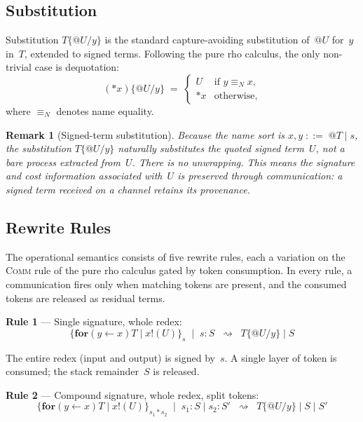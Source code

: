 \documentclass[11pt,a4paper]{article}
\makeatletter
\newtheorem{remark}[theorem]{Remark}
\newcommand{\Par}{\mathbin{|}}
\newcommand{\forc}{\mathbf{for}}
\newcommand{\send}[2]{#1 !\!\left( #2 \right)}
\newcommand{\recv}[3]{\forc\!\left( #1 \leftarrow #2 \right) #3}
\newcommand{\drop}[1]{{\ast} #1}
\newcommand{\quot}[1]{@#1}
\newcommand{\subst}[3]{#1\{#2 / #3\}}
\newcommand{\signed}[2]{\{#1\}_{#2}}
\newcommand{\comp}{\mathbin{*}}
\newcommand{\Neq}{\equiv_{\!N}}
\newcommand{\red}{\rightsquigarrow}
\makeatother
\begin{document}
\subsection{Substitution}
\label{sec:subst}

Substitution $T\{\quot{U}/y\}$ is the standard capture-avoiding
substitution of~$\quot{U}$ for~$y$ in~$T$, extended to signed
terms.  Following the pure rho calculus, the only non-trivial
case is dequotation:
\[
  (\drop{x})\{\quot{U}/y\}
  \;=\;
  \begin{cases}
    U & \text{if } y \Neq x, \\
    \drop{x} & \text{otherwise,}
  \end{cases}
\]
where $\Neq$ denotes name equality.

\begin{remark}[Signed-term substitution]
  \label{rem:signed-subst}
  Because the name sort is $x, y \;::=\; \quot{T} \mid s$,
  the substitution $T\{\quot{U}/y\}$ naturally substitutes the
  quoted \emph{signed term}~$U$, not a bare process extracted
  from~$U$.  There is no unwrapping.  This means the signature
  and cost information associated with~$U$ is \emph{preserved
  through communication}: a signed term received on a channel
  retains its provenance.
\end{remark}

\subsection{Rewrite Rules}
\label{sec:rewrites}

The operational semantics consists of five rewrite rules, each
a variation on the \textsc{Comm} rule of the pure rho calculus
gated by token consumption.  In every rule, a communication
fires only when matching tokens are present, and the
consumed tokens are released as residual terms.

\bigskip
\noindent
\textbf{Rule 1} --- Single signature, whole redex:
\begin{equation}
  \boxed{
    \signed{\recv{y}{x}{T} \Par \send{x}{U}}{s}
    \;\Par\; s : S
    \;\;\red\;\;
    \subst{T}{\quot{U}}{y} \Par S
  }
  \label{eq:rule1}
\end{equation}

\noindent
The entire redex (input and output) is signed by~$s$.  A single
layer of token is consumed; the stack remainder~$S$ is released.

\bigskip
\noindent
\textbf{Rule 2} --- Compound signature, whole redex, split
tokens:
\begin{equation}
  \boxed{
    \signed{\recv{y}{x}{T} \Par \send{x}{U}}{s_1 \comp s_2}
    \;\Par\; s_1 : S \Par s_2 : S'
    \;\;\red\;\;
    \subst{T}{\quot{U}}{y} \Par S \Par S'
  }
  \label{eq:rule2}
\end{equation}
\end{document}
